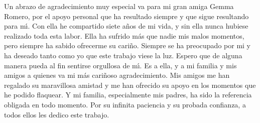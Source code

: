 Un abrazo de agradecimiento muy especial va para mi gran amiga Gemma
Romero, por el apoyo personal que ha resultado siempre y que sigue
resultando para m\'{\i}. Con ella he compartido siete a\~nos de mi
vida, y sin ella nunca hubiese realizado toda esta labor. Ella ha
sufrido m\'as que nadie mis malos momentos, pero siempre ha sabido
ofrecerme su cari\~no. Siempre se ha preocupado por mi y ha deseado
tanto como yo que este trabajo viese la luz. Espero que de alguna
manera pueda al fin sentirse orgullosa de m\'{\i}. Es a ella, y a mi
familia y mis amigos a quienes va mi m\'as cari\~noso agradecimiento.
Mis amigos me han regalado su maravillosa amistad y me han ofrecido su
apoyo en los momentos que he podido flaquear. Y mi familia,
especialmente mis padres, ha sido la referencia obligada en todo
momento. Por su infinita paciencia y su probada confianza, a todos
ellos les dedico este trabajo.

\echapter

\endinput
%
